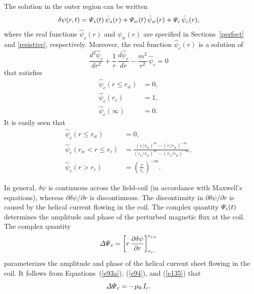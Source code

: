 \documentclass[notitlepage,12pt]{article}
\begin{document}
The solution in the outer region can be written
\begin{equation}
\delta\psi(r,t) = {\mit\Psi}_s(t)\,\hat{\psi}_s(r) + {\mit\Psi}_w(t)\,\hat{\psi}_w(r) + {\mit\Psi}_c\,\hat{\psi}_c(r),
\end{equation}
where the real functions $\hat{\psi}_s(r)$ and $\hat{\psi}_w(r)$ are specified in Sections~\ref{perfect} and \ref{resistive}, respectively. 
Moreover, 
the real function  $\hat{\psi}_c(r)$ is a solution of 
\begin{equation}\label{e100b}
\frac{d^2\hat{\psi}_c}{dr^2} + \frac{1}{r}\,\frac{d\hat{\psi}_c}{dr}-\frac{m^2}{r^2}\,\hat{\psi}_c=  0
\end{equation}
that satisfies
\begin{align}
\hat{\psi}_c(r\leq r_w) &= 0,\\[0.5ex]
\hat{\psi}_c(r_c) &= 1,\\[0.5ex]
\hat{\psi}_c(\infty) &= 0.
\end{align}
It is easily seen that
\begin{align}
\hat{\psi}_c(r\leq r_w) &= 0,\\[0.5ex]
\hat{\psi}_c(r_w<r \leq r_c) &= \frac{(r/r_w)^m-(r/r_w)^{-m}}{(r_c/r_w)^m - (r_c/r_w)^{-m}},\label{e142}\\[0.5ex]
\hat{\psi}_c(r> r_c) &=\left(\frac{r}{r_c}\right)^{-m}.\label{e143}
\end{align}

In general, $\delta\psi$ is continuous across the field-coil (in accordance with Maxwell's equations), whereas $\partial\delta\psi/\partial r$ is discontinuous. The discontinuity in $\partial\delta\psi/\partial r$ is caused by the helical current flowing in the coil. The complex quantity ${\mit\Psi}_c(t)$ determines the amplitude and
phase of the perturbed magnetic flux at the coil. The complex quantity
\begin{equation}\label{e118a}
{\mit\Delta\Psi}_c = \left[r\,\frac{\partial\delta\psi}{\partial r}\right]_{r_{c-}}^{r_{c+}}
\end{equation}
parameterizes the amplitude and phase of the helical  current sheet flowing in the coil.
It follows from Equations~(\ref{e93a}), (\ref{e94}), and (\ref{e135})  that
\begin{equation}\label{e145}
{\mit\Delta\Psi}_c = -\mu_0\,I_c.
\end{equation}
\end{document}
